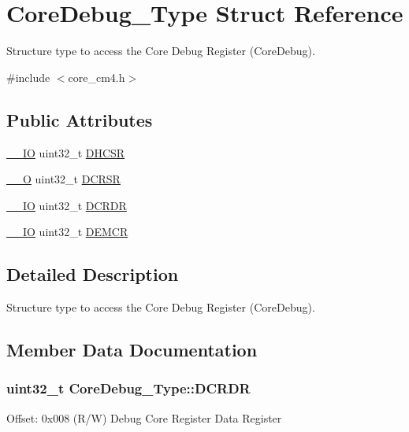 \hypertarget{struct_core_debug___type}{}\section{Core\+Debug\+\_\+\+Type Struct Reference}
\label{struct_core_debug___type}


Structure type to access the Core Debug Register (Core\+Debug).  




{\ttfamily \#include $<$core\+\_\+cm4.\+h$>$}

\subsection*{Public Attributes}
\begin{DoxyCompactItemize}
\item 
\hyperlink{core__cm4_8h_aec43007d9998a0a0e01faede4133d6be}{\+\_\+\+\_\+\+IO} uint32\+\_\+t \hyperlink{struct_core_debug___type_a25c14c022c73a725a1736e903431095d}{D\+H\+C\+SR}
\item 
\hyperlink{core__cm4_8h_a7e25d9380f9ef903923964322e71f2f6}{\+\_\+\+\_\+O} uint32\+\_\+t \hyperlink{struct_core_debug___type_afefa84bce7497652353a1b76d405d983}{D\+C\+R\+SR}
\item 
\hyperlink{core__cm4_8h_aec43007d9998a0a0e01faede4133d6be}{\+\_\+\+\_\+\+IO} uint32\+\_\+t \hyperlink{struct_core_debug___type_ab8f4bb076402b61f7be6308075a789c9}{D\+C\+R\+DR}
\item 
\hyperlink{core__cm4_8h_aec43007d9998a0a0e01faede4133d6be}{\+\_\+\+\_\+\+IO} uint32\+\_\+t \hyperlink{struct_core_debug___type_a5cdd51dbe3ebb7041880714430edd52d}{D\+E\+M\+CR}
\end{DoxyCompactItemize}


\subsection{Detailed Description}
Structure type to access the Core Debug Register (Core\+Debug). 

\subsection{Member Data Documentation}
\subsubsection[{\texorpdfstring{D\+C\+R\+DR}{DCRDR}}]{ uint32\+\_\+t Core\+Debug\+\_\+\+Type\+::\+D\+C\+R\+DR}\hypertarget{struct_core_debug___type_ab8f4bb076402b61f7be6308075a789c9}{}\label{struct_core_debug___type_ab8f4bb076402b61f7be6308075a789c9}
Offset\+: 0x008 (R/W) Debug Core Register Data Register 
